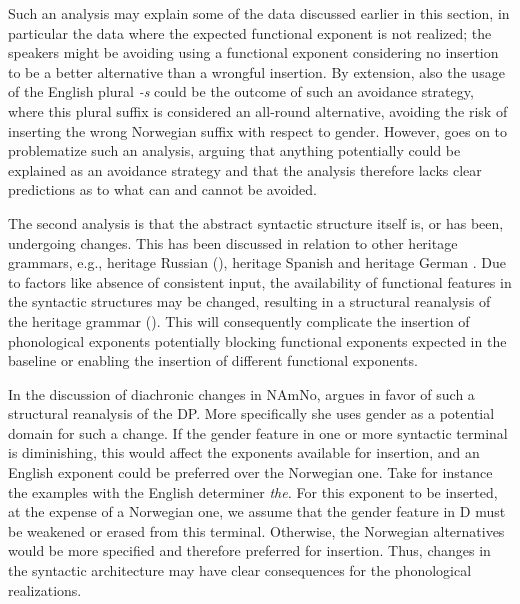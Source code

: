 \documentclass[output=paper]{langscibook}
\begin{document}
Such an analysis may explain some of the data discussed earlier in this section, in particular the data where the expected functional exponent is not realized; the speakers might be avoiding using a functional exponent considering no insertion to be a better alternative than a wrongful insertion. By extension, also the usage of the English plural \textit{{}-s} could be the outcome of such an avoidance strategy, where this plural suffix is considered an all-round alternative, avoiding the risk of inserting the wrong Norwegian suffix with respect to gender. However, \citet{Riksem2017} goes on to problematize such an analysis, arguing that anything potentially could be explained as an avoidance strategy and that the analysis therefore lacks clear predictions as to what can and cannot be avoided. 



The second analysis is that the abstract syntactic structure itself is, or has been, undergoing changes. This has been discussed in relation to other heritage grammars, e.g., heritage Russian (\citealt{Polinsky2011,Polinsky2016}), heritage Spanish \citep{ScontrasEtAl2015} and heritage German \citep{YagerEtAl2015}. Due to factors like absence of consistent input, the availability of functional features in the syntactic structures may be changed, resulting in a structural reanalysis of the heritage grammar (\citealt{Polinsky2011, PutnamSánchez2013}). This will consequently complicate the insertion of phonological exponents potentially blocking functional exponents expected in the baseline or enabling the insertion of different functional exponents. 



In the discussion of diachronic changes in NAmNo, \citet{Riksem2017} argues in favor of such a structural reanalysis of the DP. More specifically she uses gender as a potential domain for such a change. If the gender feature in one or more syntactic terminal is diminishing, this would affect the exponents available for insertion, and an English exponent could be preferred over the Norwegian one. Take for instance the examples with the English determiner \textit{the.} For this exponent to be inserted, at the expense of a Norwegian one, we assume that the gender feature in D must be weakened or erased from this terminal. Otherwise, the Norwegian alternatives would be more specified and therefore preferred for insertion. Thus, changes in the syntactic architecture may have clear consequences for the phonological realizations. 
\end{document}
